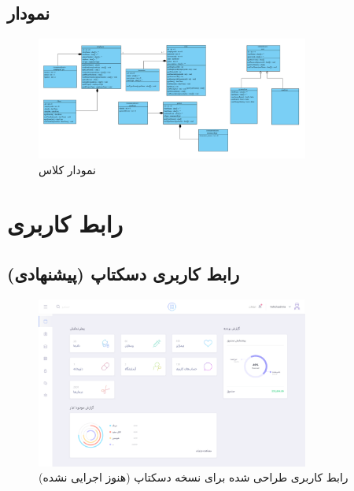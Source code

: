 \documentclass[a4paper,12pt]{report}
\begin{document}
	\section{
		نمودار 
		}\label{sec3:chap2}

	\begin{figure}[!h]
		\label{fig1:sec3:chap2}
		\begin{center}
			\includegraphics[width=0.8\textwidth]{diagrams/classDiagram.pdf}
			\caption{نمودار کلاس}
		\end{center}
	\end{figure}

	\chapter{
		رابط کاربری}
	\label{chp3}
	\section{
	رابط کاربری دسکتاپ (پیشنهادی)}\label{sec1:chap3}

	\begin{figure}[!h]
		\label{fig1:sec1:chap3}
		\begin{center}
			\includegraphics[width=0.8\textwidth]{UI/Desktop-UI.pdf}
			\caption{
			رابط کاربری طراحی شده برای نسخه دسکتاپ (هنوز اجرایی نشده)
			}
		\end{center}
	\end{figure}
	
\end{document}
